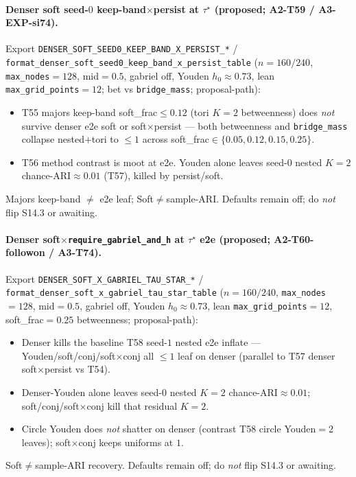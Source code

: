 \documentclass[11pt]{article}
\begin{document}
\paragraph{Denser soft seed-$0$ keep-band$\times$persist at $\tau^\star$
(proposed; A2-T59 / A3-EXP-si74).}
Export \texttt{DENSER\_SOFT\_SEED0\_KEEP\_BAND\_X\_PERSIST\_*} /
\texttt{format\_denser\_soft\_seed0\_keep\_band\_x\_persist\_table}
($n{=}160/240$, \texttt{max\_nodes}${=}128$, mid${=}0.5$, gabriel off,
Youden $h_0\approx 0.73$, lean \texttt{max\_grid\_points}${=}12$;
bet vs \texttt{bridge\_mass}; proposal-path):
\begin{itemize}[leftmargin=1.5em]
  \item T55 majors keep-band soft\_frac$\le 0.12$ (tori $K{=}2$
  betweenness) does \emph{not} survive denser e2e soft or
  soft$\times$persist --- both betweenness and \texttt{bridge\_mass}
  collapse nested$+$tori to $\le 1$ across
  soft\_frac$\in\{0.05,0.12,0.15,0.25\}$.
  \item T56 method contrast is moot at e2e. Youden alone leaves seed-$0$
  nested $K{=}2$ chance-ARI$\approx 0.01$ (T57), killed by
  persist/soft.
\end{itemize}
Majors keep-band $\neq$ e2e leaf; Soft$\neq$sample-ARI. Defaults remain
off; do \emph{not} flip S14.3 or awaiting.

\paragraph{Denser soft$\times$\texttt{require\_gabriel\_and\_h} at $\tau^\star$
e2e (proposed; A2-T60-followon / A3-T74).}
Export \texttt{DENSER\_SOFT\_X\_GABRIEL\_TAU\_STAR\_*} /
\texttt{format\_denser\_soft\_x\_gabriel\_tau\_star\_table}
($n{=}160/240$, \texttt{max\_nodes}${=}128$, mid${=}0.5$, gabriel off,
Youden $h_0\approx 0.73$, lean \texttt{max\_grid\_points}${=}12$,
soft\_frac${=}0.25$ betweenness; proposal-path):
\begin{itemize}[leftmargin=1.5em]
  \item Denser kills the baseline T58 seed-$1$ nested e2e inflate ---
  Youden/soft/conj/soft$\times$conj all $\le 1$ leaf on denser
  (parallel to T57 denser soft$\times$persist vs T54).
  \item Denser-Youden alone leaves seed-$0$ nested $K{=}2$
  chance-ARI$\approx 0.01$; soft/conj/soft$\times$conj kill that
  residual $K{=}2$.
  \item Circle Youden does \emph{not} shatter on denser (contrast T58
  circle Youden${=}2$ leaves); soft$\times$conj keeps uniforms at $1$.
\end{itemize}
Soft$\neq$sample-ARI recovery. Defaults remain off; do \emph{not} flip
S14.3 or awaiting.
\end{document}
